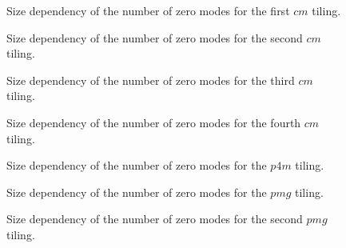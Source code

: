 	
		\begin{figure}[!ht]
				\caption{Size dependency of the number of zero modes for the first $cm$ tiling.}
				\label{fig:san:cm:1}
			\end{figure}

	
		\begin{figure}[!ht]
				\caption{Size dependency of the number of zero modes for the second $cm$ tiling.}
				\label{fig:san:cm:2}
			\end{figure}

	
		\begin{figure}[!ht]
				\caption{Size dependency of the number of zero modes for the third $cm$ tiling.}
				\label{fig:san:cm:3}
			\end{figure}

	
		\begin{figure}[!ht]
				\caption{Size dependency of the number of zero modes for the fourth $cm$ tiling.}
				\label{fig:san:cm:4}
			\end{figure}

	
		\begin{figure}[!ht]
				\caption{Size dependency of the number of zero modes for the $p4m$ tiling.}
				\label{fig:san:p4m}
			\end{figure}

	
		\begin{figure}[!ht]
				\caption{Size dependency of the number of zero modes for the $pmg$ tiling.}
				\label{fig:san:pmg:1}
			\end{figure}
			
			
		\begin{figure}[!ht]
				\caption{Size dependency of the number of zero modes for the second $pmg$ tiling.}
				\label{fig:san:pmg:2}
			\end{figure}

